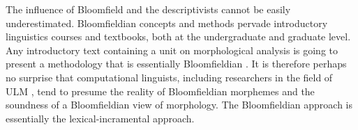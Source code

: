 The influence of Bloomfield and the descriptivists %
cannot be easily underestimated. Bloomfieldian concepts and methods pervade introductory linguistics courses and textbooks, both at
the undergraduate and graduate level. Any introductory text containing a unit on morphological analysis is going to present a methodology that is essentially Bloomfieldian \citep{anderson:2017}.
It is therefore perhaps no surprise that
computational linguists, including researchers in the field of \ac{ULM} , tend to presume %
the reality of Bloomfieldian morphemes and the soundness of a Bloomfieldian view of morphology. The Bloomfieldian approach is essentially
the lexical-incramental approach.



